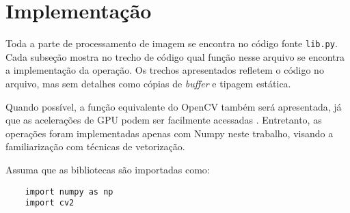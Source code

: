 \section{Implementação}

Toda a parte de processamento de imagem se encontra no código fonte \texttt{lib.py}. Cada subseção mostra no trecho de código qual função nesse arquivo se encontra a implementação da operação. Os trechos apresentados refletem o código no arquivo, mas sem detalhes como cópias de \textit{buffer} e tipagem estática.

Quando possível, a função equivalente do OpenCV também será apresentada, já que as acelerações de GPU podem ser facilmente acessadas \autocite{ref:cvcuda}. Entretanto, as operações foram implementadas apenas com Numpy neste trabalho, visando a familiarização com técnicas de vetorização.

Assuma que as bibliotecas são importadas como:

\begin{verbatim}
    import numpy as np
    import cv2
\end{verbatim}



